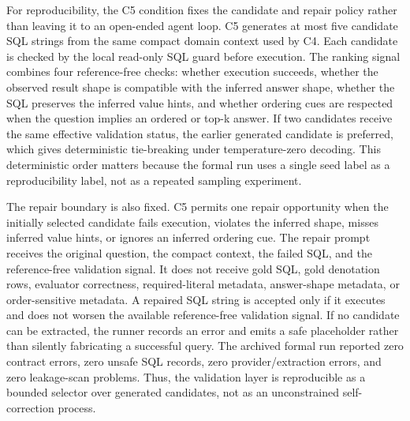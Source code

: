 \documentclass{ieeeaccess}
\begin{document}
For reproducibility, the C5 condition fixes the candidate and repair policy rather than leaving it to an open-ended agent loop. C5 generates at most five candidate SQL strings from the same compact domain context used by C4. Each candidate is checked by the local read-only SQL guard before execution. The ranking signal combines four reference-free checks: whether execution succeeds, whether the observed result shape is compatible with the inferred answer shape, whether the SQL preserves the inferred value hints, and whether ordering cues are respected when the question implies an ordered or top-k answer. If two candidates receive the same effective validation status, the earlier generated candidate is preferred, which gives deterministic tie-breaking under temperature-zero decoding. This deterministic order matters because the formal run uses a single seed label as a reproducibility label, not as a repeated sampling experiment.

The repair boundary is also fixed. C5 permits one repair opportunity when the initially selected candidate fails execution, violates the inferred shape, misses inferred value hints, or ignores an inferred ordering cue. The repair prompt receives the original question, the compact context, the failed SQL, and the reference-free validation signal. It does not receive gold SQL, gold denotation rows, evaluator correctness, required-literal metadata, answer-shape metadata, or order-sensitive metadata. A repaired SQL string is accepted only if it executes and does not worsen the available reference-free validation signal. If no candidate can be extracted, the runner records an error and emits a safe placeholder rather than silently fabricating a successful query. The archived formal run reported zero contract errors, zero unsafe SQL records, zero provider/extraction errors, and zero leakage-scan problems. Thus, the validation layer is reproducible as a bounded selector over generated candidates, not as an unconstrained self-correction process.
\end{document}
